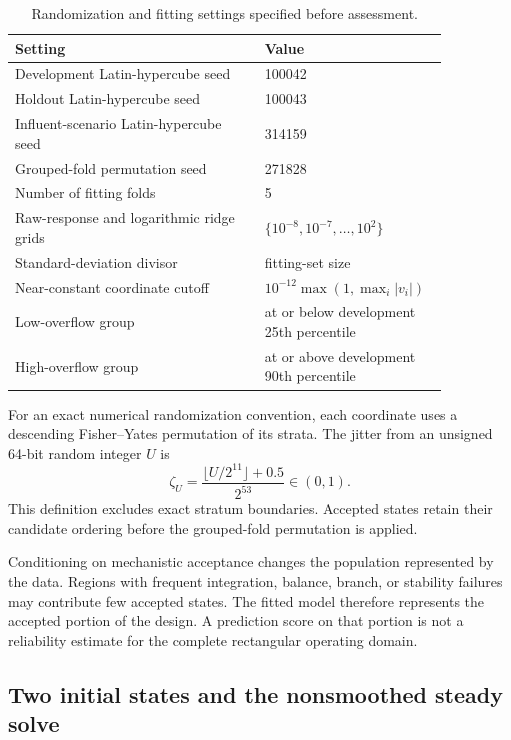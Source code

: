 \begin{table}[htbp]
\centering\small
\caption{Randomization and fitting settings specified before assessment.}
\label{tab:plant_design_settings}
\begin{tabular}{p{0.54\linewidth}p{0.32\linewidth}}
\toprule Setting & Value\\\midrule
Development Latin-hypercube seed & 100042\\
Holdout Latin-hypercube seed & 100043\\
Influent-scenario Latin-hypercube seed & 314159\\
Grouped-fold permutation seed & 271828\\
Number of fitting folds & 5\\
Raw-response and logarithmic ridge grids & $\{10^{-8},10^{-7},\ldots,10^2\}$\\
Standard-deviation divisor & fitting-set size\\
Near-constant coordinate cutoff & $10^{-12}\max(1,\max_i|v_i|)$\\
Low-overflow group & at or below development 25th percentile\\
High-overflow group & at or above development 90th percentile\\
\bottomrule
\end{tabular}
\end{table}

For an exact numerical randomization convention, each coordinate uses a descending Fisher--Yates permutation of its strata. The jitter from an unsigned 64-bit random integer $U$ is
\begin{equation}
\zeta_U=\frac{\lfloor U/2^{11}\rfloor+0.5}{2^{53}}\in(0,1).
\end{equation}
This definition excludes exact stratum boundaries. Accepted states retain their candidate ordering before the grouped-fold permutation is applied.

Conditioning on mechanistic acceptance changes the population represented by the data. Regions with frequent integration, balance, branch, or stability failures may contribute few accepted states. The fitted model therefore represents the accepted portion of the design. A prediction score on that portion is not a reliability estimate for the complete rectangular operating domain.

\subsection{Two initial states and the nonsmoothed steady solve}

